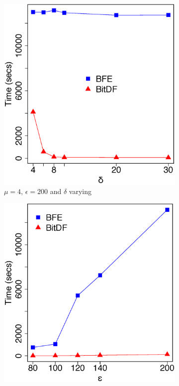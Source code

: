 \begin{figure}[h!]
    \centering
    \begin{subfigure}[t]{0.48\textwidth}
        \includegraphics[width=\textwidth]{images/Brinkhoff_n_4_g_200_varying_l.eps}
        \caption{$\mu = 4$, $\epsilon = 200$ and $\delta$ varying}
        \label{fig:brinkhoff_vary_l}
    \end{subfigure}
    \begin{subfigure}[t]{0.48\textwidth}
        \includegraphics[width=\textwidth]{images/Brinkhoff_n_4_l_8_varying_g.eps}

\end{subfigure}
\end{figure}
